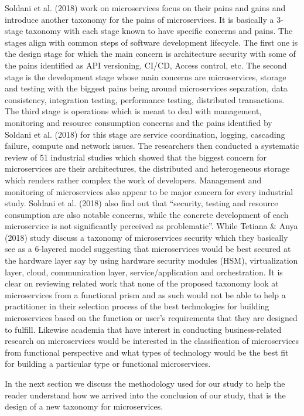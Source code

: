 \documentclass{article}
\begin{document}
Soldani et al. (2018) work on microservices focus on their pains and gains and introduce another taxonomy for the pains of microservices. It is basically a 3-stage taxonomy with each stage known to have specific concerns and pains. The stages align with common steps of software development lifecycle. The first one is the design stage for which the main concern is architecture security with some of the pains identified as API versioning, CI/CD, Access control, etc. The second stage is the development stage whose main concerns are microservices, storage and testing with the biggest pains being around microservices separation, data consistency, integration testing, performance testing, distributed transactions. The third stage is operations which is meant to deal with management, monitoring and resource consumption concerns and the pains identified by Soldani et al. (2018) for this stage are service coordination, logging, cascading failure, compute and network issues. The researchers then conducted a systematic review of 51 industrial studies which showed that the biggest concern for microservices are their architectures, the distributed and heterogeneous storage which renders rather complex the work of developers. Management and monitoring of microservices also appear to be major concern for every industrial study. Soldani et al. (2018) also find out that “security, testing and resource consumption are also notable concerns, while the concrete development of each microservice is not significantly perceived as problematic”. While Tetiana \& Anya (2018) study discuss a taxonomy of microservices security which they basically see as a 6-layered model suggesting that microservices would be best secured at the hardware layer say by using hardware security modules (HSM), virtualization layer, cloud, communication layer, service/application and orchestration. It is clear on reviewing related work that none of the proposed taxonomy look at microservices from a functional prism and as such would not be able to help a practitioner in their selection process of the best technologies for building microservices based on the function or user's requirements that they are designed to fulfill. Likewise academia that have interest in conducting business-related research on microservices would be interested in the classification of microservices from functional perspective and what types of technology would be the best fit for building a particular type or functional microservices.


In the next section we discuss the methodology used for our study to help the reader understand how we arrived into the conclusion of our study, that is the design of a new taxonomy for microservices.
\end{document}
